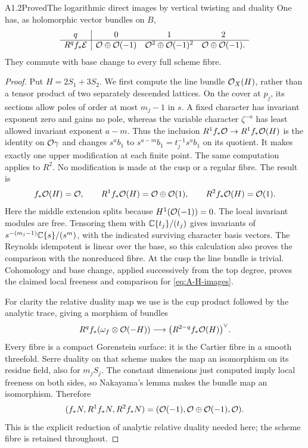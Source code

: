\begin{claim}{A1.2}{Proved}{The logarithmic direct images by vertical twisting and duality}
One has, as holomorphic vector bundles on $B$,
\[
\begin{array}{c|ccc}
q&0&1&2\\\hline
R^qf_*\mathcal E&\mathcal O\oplus\mathcal O(-1)&
 \mathcal O^2\oplus\mathcal O(-1)^2&\mathcal O\oplus\mathcal O(-1).
\end{array}
\]
They commute with base change to every full scheme fibre.
\end{claim}
\begin{proof}
Put $H=2S_1+3S_2$.  We first compute the line bundle $\mathcal O_X(H)$,
rather than a tensor product of two separately descended lattices.
On the cover at $p_j$, its sections allow poles of order at most $m_j-1$
in $s$.  A fixed character has invariant exponent zero and gains no
pole, whereas the variable character $\zeta^{-a}$ has least allowed
invariant exponent $a-m$.  Thus the inclusion
$R^1f_*\mathcal O\to R^1f_*\mathcal O(H)$ is the identity on $\mathcal O\gamma$ and
changes $s^ab_1$ to $s^{a-m}b_1=t_j^{-1}s^ab_1$ on its quotient.
It makes exactly one upper modification at each finite point.
The same computation applies to $R^2$.  No modification is made at
the cusp or a regular fibre.  The result is
\begin{equation}\label{eq:A-H-images}
f_*\mathcal O(H)=\mathcal O,\qquad
R^1f_*\mathcal O(H)=\mathcal O\oplus\mathcal O(1),\qquad
R^2f_*\mathcal O(H)=\mathcal O(1).
\end{equation}
Here the middle extension splits because $H^1(\mathcal O(-1))=0$.
The local invariant modules are free.  Tensoring them with
$\mathbb C\{t_j\}/(t_j)$ gives invariants of
$s^{-(m_j-1)}\mathbb C\{s\}/(s^m)$, with the indicated surviving character
basis vectors.  The Reynolds idempotent is linear over the base,
so this calculation also proves the comparison with the nonreduced
fibre.  At the cusp the line bundle is trivial.  Cohomology and base
change, applied successively from the top degree, proves the claimed
local freeness and comparison for \eqref{eq:A-H-images}.

For clarity the relative duality map we use is the cup product followed
by the analytic trace, giving a morphism of bundles
\[
R^qf_*(\omega_f\otimes\mathcal O(-H))\longrightarrow
\bigl(R^{2-q}f_*\mathcal O(H)\bigr)^\vee.
\]
Every fibre is a compact Gorenstein surface: it is the Cartier fibre
in a smooth threefold.  Serre duality on that scheme makes the map
an isomorphism on its residue field, also for $m_jS_j$.  The constant
dimensions just computed imply local freeness on both sides, so
Nakayama's lemma makes the bundle map an isomorphism.  Therefore
\begin{equation}\label{eq:A-N-images}
(f_*N,R^1f_*N,R^2f_*N)
=(\mathcal O(-1),\mathcal O\oplus\mathcal O(-1),\mathcal O).
\end{equation}
This is the explicit reduction of analytic relative duality needed
here; the scheme fibre is retained throughout.


\end{proof}
